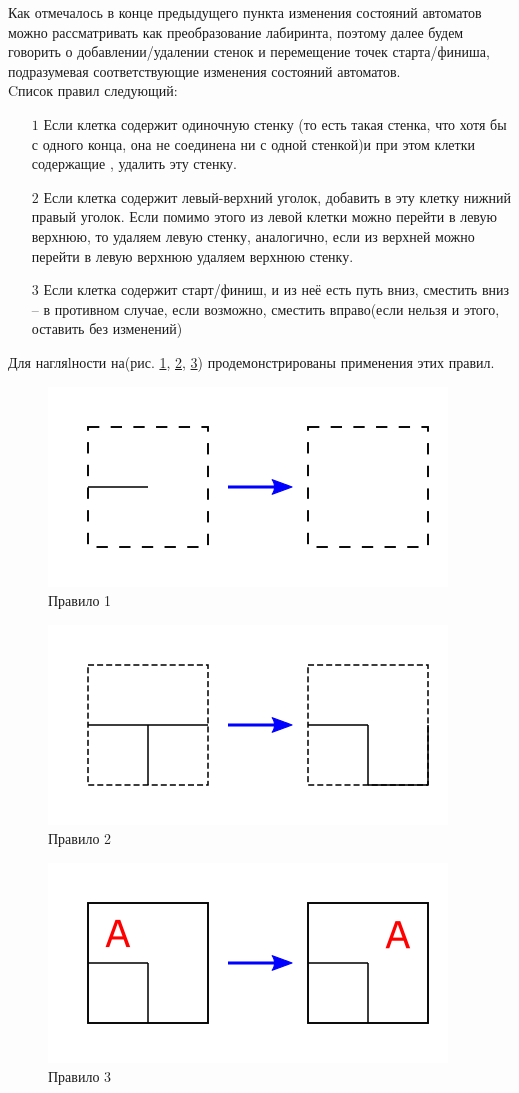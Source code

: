 \documentclass[12pt]{article}
\begin{document}
Как отмечалось в конце предыдущего пункта изменения состояний автоматов можно рассматривать как преобразование лабиринта, поэтому далее будем говорить о добавлении/удалении стенок и перемещение точек старта/финиша, подразумевая соответствующие изменения состояний автоматов.\\
Cписок правил следующий:
\begin{itemize}
	\item[$1$] Если клетка содержит одиночную стенку (то есть такая стенка, что хотя бы с одного конца, она не соединена ни с одной стенкой)и при этом клетки содержащие , удалить эту стенку.
	\item[$2$] Если клетка содержит левый-верхний уголок, добавить в эту клетку нижний правый уголок. Если помимо этого из левой клетки можно перейти в левую верхнюю, то удаляем левую стенку, аналогично, если  из верхней можно перейти в  левую верхнюю удаляем верхнюю стенку.
	\item[$3$] Если клетка содержит старт/финиш, и из неё есть путь вниз, сместить вниз -- в противном случае, если возможно, сместить вправо(если нельзя и этого, оставить без изменений)
\end{itemize}

Для нагляlности на(рис. \ref{fig:r1}, \ref{fig:r2}, \ref{fig:r3}) продемонстрированы применения этих правил.

		  \begin{figure}[H]
		  	  \centering
              \includegraphics[width=0.4\linewidth]{rule1}
              \caption{Правило 1}
              \label{fig:r1}
          \end{figure}
          \begin{figure}[H]
          \centering
              \includegraphics[width=0.4\linewidth]{rule2}
              \caption{Правило 2}
              \label{fig:r2}
          \end{figure}
          \begin{figure}[H]
          \centering 
              \includegraphics[width=0.4\linewidth]{rule3}
              \caption{Правило 3}
              \label{fig:r3}
          \end{figure}
          
\end{document}
